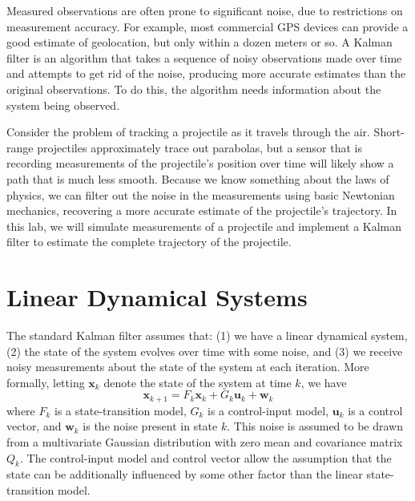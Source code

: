 
Measured observations are often prone to significant noise, due to restrictions on measurement accuracy.
For example, most commercial GPS devices can provide a good estimate of geolocation, but only within a dozen meters or so.
A Kalman filter is an algorithm that takes a sequence of noisy observations made over time and attempts to get rid of the noise,
producing more accurate estimates than the original observations.
To do this, the algorithm needs information about the system being observed.

Consider the problem of tracking a projectile as it travels through the air.
Short-range projectiles approximately trace out parabolas, but a sensor that is recording measurements of the projectile's position over time will likely show a path that is much
less smooth.
Because we know something about the laws of physics, we can filter out the noise in the measurements using basic Newtonian mechanics, recovering a more accurate estimate
of the projectile's trajectory.
In this lab, we will simulate measurements of a projectile and implement a Kalman filter to estimate the complete trajectory of the projectile.

\section*{Linear Dynamical Systems}
The standard Kalman filter assumes that:
(1) we have a linear dynamical system,
(2) the state of the system evolves over time with some noise, and
(3) we receive noisy measurements about the state of the system at each iteration.
More formally, letting $\mathbf{x}_{k}$ denote the state of the system at time $k$, we have
\begin{equation}
\mathbf{x}_{k+1} = F_{k} \mathbf{x}_{k} + G_{k}\mathbf{u}_{k} + \mathbf{w}_{k}
\label{eq:state}
\end{equation}
where $F_{k}$ is a state-transition model, $G_{k}$ is a control-input model, $\mathbf{u}_{k}$ is a control vector, and $\mathbf{w}_{k}$ is the noise present in state $k$.
This noise is assumed to be drawn from a multivariate Gaussian distribution with zero mean and covariance matrix $Q_{k}$.
The control-input model and control vector allow the assumption that the state can be additionally influenced by some other factor than the linear state-transition model.

